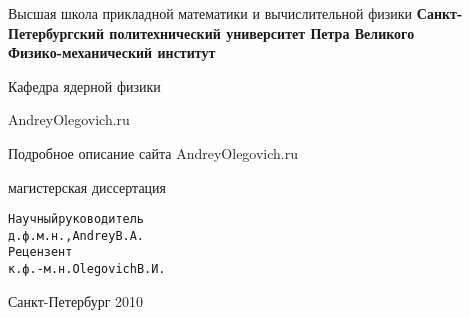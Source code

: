 \begin{titlepage}
  \newpage
  \begin{center}
    Высшая школа прикладной математики и вычислительной физики
    {\bfseries Санкт-Петербургский политехнический университет Петра Великого \\
    Физико-механический институт}
    \vspace{1cm}

    Кафедра ядерной физики
    \vspace{6em}




    AndreyOlegovich.ru \\
  \end{center}

  \vspace{1.2em}

  \begin{center}
    \Large Подробное описание сайта \linebreak
    AndreyOlegovich.ru
  \end{center}

  \vspace{5em}

  \begin{center}
    магистерская диссертация
  \end{center}
  \vspace{6em}


  \begin{alltt}
    Научный руководитель
    д.ф.м.н., Andrey В.А.
    Рецензент
    к.ф.-м.н. Olegovich В.И.
  \end{alltt}


  \vspace{\fill}

  \begin{center}
    Санкт-Петербург 2010
  \end{center}
\end{titlepage}